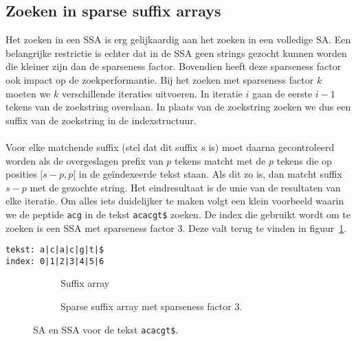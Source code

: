 \subsection{Zoeken in sparse suffix arrays}\label{subsec:zoeken-in-sparse-suffix-arrays}
Het zoeken in een SSA is erg gelijkaardig aan het zoeken in een volledige SA\@.
Een belangrijke restrictie is echter dat in de SSA geen strings gezocht kunnen worden die kleiner zijn dan de sparseness factor.
Bovendien heeft deze sparseness factor ook impact op de zoekperformantie.
Bij het zoeken met sparseness factor $k$ moeten we $k$ verschillende iteraties uitvoeren.
In iteratie $i$ gaan de eerste $i - 1$ tekens van de zoekstring overslaan.
In plaats van de zoekstring zoeken we dus een suffix van de zoekstring in de indexstructuur.
\\ \\
Voor elke matchende suffix (stel dat dit suffix $s$ is) moet daarna gecontroleerd worden als de overgeslagen prefix van $p$ tekens matcht met de $p$ tekens die op posities $[s - p, p[$ in de geïndexeerde tekst staan.
Als dit zo is, dan matcht suffix $s - p$ met de gezochte string.
Het eindresultaat is de unie van de resultaten van elke iteratie.
Om alles iets duidelijker te maken volgt een klein voorbeeld waarin we de peptide \texttt{acg} in de tekst \texttt{acacgt\$} zoeken.
De index die gebruikt wordt om te zoeken is een SSA met sparseness factor 3.
Deze valt terug te vinden in figuur~\ref{fig:sparse_sa}.

\begin{center}
    \texttt{tekst: a|c|a|c|g|t|\$\\index: 0|1|2|3|4|5|6}
\end{center}
\begin{figure}[H]
    \hfill
    \begin{subfigure}[t]{0.45\linewidth}
        \centering
        \caption{Suffix array}
    \end{subfigure}
    \hfill
    \begin{subfigure}[t]{0.45\linewidth}
        \centering
        \caption{Sparse suffix array met sparseness factor 3.}
    \end{subfigure}
    \hfill
    \caption{SA en SSA voor de tekst \texttt{acacgt\$}.}
    \label{fig:sparse_sa}
\end{figure}

